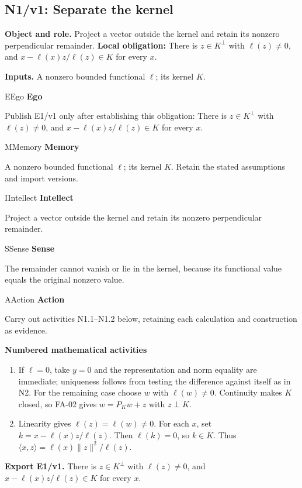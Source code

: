 \documentclass[preprint,12pt,aps,pra,showkeys,amsmath,amssymb,superscriptaddress,floatfix]{revtex4-2}
\theoremstyle{definition}
\theoremstyle{remark}
\newcommand{\mmfaculty}[3]{%
 \begin{mmfacultybox}{#1}{#2}
 {\sffamily\bfseries\color{MMBlue}#2}\par\smallskip #3
 \end{mmfacultybox}}
\newcommand{\field}[2]{\par\smallskip\noindent\textbf{#1.} #2\par}
\begin{document}
\subsection{N1/v1: Separate the kernel}

\field{Object and role}{Project a vector outside the kernel and retain its nonzero perpendicular
remainder. \textbf{Local obligation:} There is \(z\in K^\perp\) with
\(\ell(z)\ne0\), and \(x-\ell(x)z/\ell(z)\in K\) for every \(x\).}

\field{Inputs}{A nonzero bounded functional \(\ell\); its kernel \(K\).}

\mmfaculty{E}{Ego}{Publish E1/v1 only after establishing this obligation: There is
\(z\in K^\perp\) with \(\ell(z)\ne0\), and \(x-\ell(x)z/\ell(z)\in K\)
for every \(x\).}

\mmfaculty{M}{Memory}{A nonzero bounded functional \(\ell\); its kernel \(K\). Retain the
stated assumptions and import versions.}

\mmfaculty{I}{Intellect}{Project a vector outside the kernel and retain its nonzero perpendicular
remainder.}

\mmfaculty{S}{Sense}{The remainder cannot vanish or lie in the kernel, because its functional
value equals the original nonzero value.}

\mmfaculty{A}{Action}{Carry out activities N1.1--N1.2 below, retaining each calculation and
construction as evidence.}

\smallskip\noindent\textbf{Numbered mathematical activities}

\begin{enumerate}[label=N1.\arabic*,leftmargin=3.4em]

\item If \(\ell=0\), take \(y=0\) and the representation and norm equality are
immediate; uniqueness follows from testing the difference against itself
as in N2. For the remaining case choose \(w\) with \(\ell(w)\ne0\).
Continuity makes \(K\) closed, so FA-02 gives \(w=P_Kw+z\) with
\(z\perp K\).

\item Linearity gives \(\ell(z)=\ell(w)\ne0\). For each \(x\), set
\(k=x-\ell(x)z/\ell(z)\). Then \(\ell(k)=0\), so \(k\in K\). Thus
\(\langle x,z\rangle=\ell(x)\|z\|^2/\ell(z)\).

\end{enumerate}

\field{Export E1/v1}{There is \(z\in K^\perp\) with \(\ell(z)\ne0\), and
\(x-\ell(x)z/\ell(z)\in K\) for every \(x\).}
\end{document}
